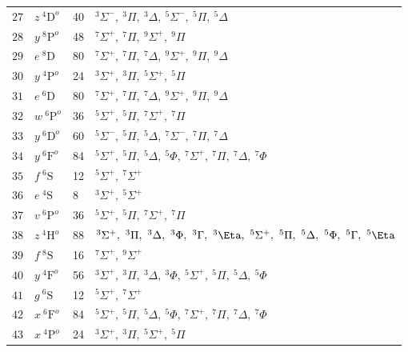 \begin{table*}[]
\begin{tabular*}{\textwidth}{llll@{\extracolsep{\fill}}}
$ 27$ & $ z~^4\mathrm{D}^o$ &   40& $   ^{3}\Sigma^-,\ ^{3}\Pi,\     ^{3}\Delta,\   ^{5}\Sigma^-,\ ^{5}\Pi,\     ^{5}\Delta$ \\
$ 28$ & $ y~^8\mathrm{P}^o$ &   48& $   ^{7}\Sigma^+,\ ^{7}\Pi,\   ^{9}\Sigma^+,\ ^{9}\Pi$ \\
$ 29$ & $ e~^8\mathrm{D}$   &   80& $   ^{7}\Sigma^+,\ ^{7}\Pi,\     ^{7}\Delta,\   ^{9}\Sigma^+,\ ^{9}\Pi,\     ^{9}\Delta$ \\
$ 30$ & $ y~^4\mathrm{P}^o$ &   24& $   ^{3}\Sigma^+,\ ^{3}\Pi,\   ^{5}\Sigma^+,\ ^{5}\Pi$ \\
$ 31$ & $ e~^6\mathrm{D}$   &   80& $   ^{7}\Sigma^+,\ ^{7}\Pi,\     ^{7}\Delta,\   ^{9}\Sigma^+,\ ^{9}\Pi,\     ^{9}\Delta$ \\
$ 32$ & $ w~^6\mathrm{P}^o$ &   36& $   ^{5}\Sigma^+,\ ^{5}\Pi,\   ^{7}\Sigma^+,\ ^{7}\Pi$ \\
$ 33$ & $ y~^6\mathrm{D}^o$ &   60& $   ^{5}\Sigma^-,\ ^{5}\Pi,\     ^{5}\Delta,\   ^{7}\Sigma^-,\ ^{7}\Pi,\     ^{7}\Delta$ \\
$ 34$ & $ y~^6\mathrm{F}^o$ &   84& $   ^{5}\Sigma^+,\ ^{5}\Pi,\     ^{5}\Delta,\ ^{5}\Phi,\   ^{7}\Sigma^+,\ ^{7}\Pi,\     ^{7}\Delta,\ ^{7}\Phi$ \\
$ 35$ & $ f~^6\mathrm{S}$   &   12& $   ^{5}\Sigma^+,\ ^{7}\Sigma^+$ \\
$ 36$ & $ e~^4\mathrm{S}$   &    8& $   ^{3}\Sigma^+,\ ^{5}\Sigma^+$ \\
$ 37$ & $ v~^6\mathrm{P}^o$ &   36& $   ^{5}\Sigma^+,\ ^{5}\Pi,\   ^{7}\Sigma^+,\ ^{7}\Pi$ \\
$ 38$ & $ z~^4\mathrm{H}^o$ &   88& $   ^{3}\Sigma^+,\ ^{3}\Pi,\     ^{3}\Delta,\ ^{3}\Phi,\     ^{3}\Gamma,\ ^{3}\Eta,\   ^{5}\Sigma^+,\ ^{5}\Pi,\     ^{5}\Delta,\ ^{5}\Phi,\     ^{5}\Gamma,\ ^{5}\Eta$ \\
$ 39$ & $ f~^8\mathrm{S}$   &   16& $   ^{7}\Sigma^+,\ ^{9}\Sigma^+$ \\
$ 40$ & $ y~^4\mathrm{F}^o$ &   56& $   ^{3}\Sigma^+,\ ^{3}\Pi,\     ^{3}\Delta,\ ^{3}\Phi,\   ^{5}\Sigma^+,\ ^{5}\Pi,\     ^{5}\Delta,\ ^{5}\Phi$ \\
$ 41$ & $ g~^6\mathrm{S}$   &   12& $   ^{5}\Sigma^+,\ ^{7}\Sigma^+$ \\
$ 42$ & $ x~^6\mathrm{F}^o$ &   84& $   ^{5}\Sigma^+,\ ^{5}\Pi,\     ^{5}\Delta,\ ^{5}\Phi,\   ^{7}\Sigma^+,\ ^{7}\Pi,\     ^{7}\Delta,\ ^{7}\Phi$ \\
$ 43$ & $ x~^4\mathrm{P}^o$ &   24& $   ^{3}\Sigma^+,\ ^{3}\Pi,\   ^{5}\Sigma^+,\ ^{5}\Pi$ \\

\end{tabular*}
\end{table*}
